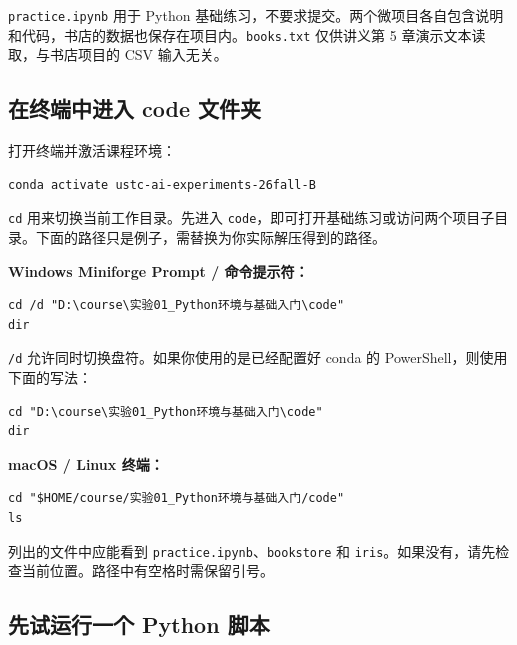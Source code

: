 \documentclass[UTF8,a4paper,11pt,fontset=fandol]{ctexart}
\providecommand{\passthrough}[1]{#1}
\begin{document}
\passthrough{\lstinline!practice.ipynb!} 用于 Python 基础练习，不要求提交。两个微项目各自包含说明和代码，书店的数据也保存在项目内。\passthrough{\lstinline!books.txt!} 仅供讲义第 5 章演示文本读取，与书店项目的 CSV 输入无关。

\subsection{在终端中进入 code 文件夹}\label{ux5728ux7ec8ux7aefux4e2dux8fdbux5165-code-ux6587ux4ef6ux5939}

打开终端并激活课程环境：

\begin{lstlisting}[language={}]
conda activate ustc-ai-experiments-26fall-B
\end{lstlisting}

\passthrough{\lstinline!cd!} 用来切换当前工作目录。先进入 \passthrough{\lstinline!code!}，即可打开基础练习或访问两个项目子目录。下面的路径只是例子，需替换为你实际解压得到的路径。

\textbf{Windows Miniforge Prompt / 命令提示符：}

\begin{lstlisting}[language={}]
cd /d "D:\course\实验01_Python环境与基础入门\code"
dir
\end{lstlisting}

\passthrough{\lstinline!/d!} 允许同时切换盘符。如果你使用的是已经配置好 conda 的 PowerShell，则使用下面的写法：

\begin{lstlisting}[language={}]
cd "D:\course\实验01_Python环境与基础入门\code"
dir
\end{lstlisting}

\textbf{macOS / Linux 终端：}

\begin{lstlisting}[language={}]
cd "$HOME/course/实验01_Python环境与基础入门/code"
ls
\end{lstlisting}

列出的文件中应能看到 \passthrough{\lstinline!practice.ipynb!}、\passthrough{\lstinline!bookstore!} 和 \passthrough{\lstinline!iris!}。如果没有，请先检查当前位置。路径中有空格时需保留引号。

\clearpage

\subsection{先试运行一个 Python 脚本}\label{ux5148ux8bd5ux8fd0ux884cux4e00ux4e2a-python-ux811aux672c}
\end{document}
